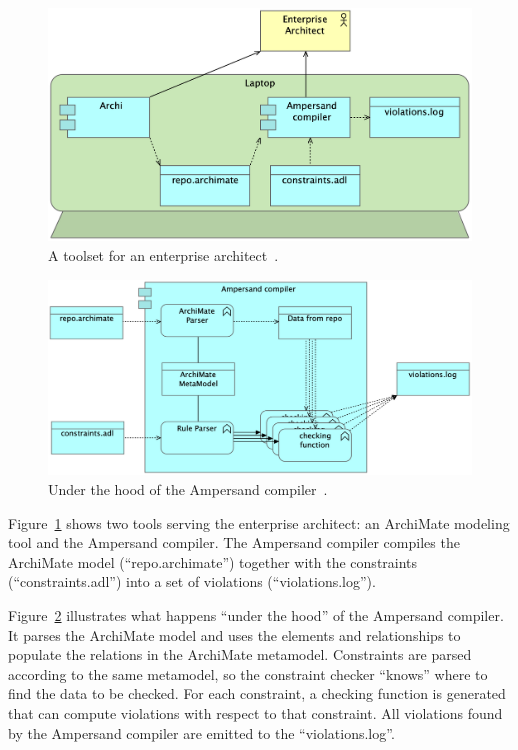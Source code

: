 \documentclass[sn-vancouver]{sn-jnl}%
\begin{document}
\begin{figure}[b]
 \centering
\includegraphics[clip=true, scale=0.19]{Figure4}
\caption{A toolset for an enterprise architect~\cite{iceis22}.}
\label{fig4}   %
\end{figure}
\begin{figure}[b]
 \centering
\includegraphics[clip=true, scale=0.16]{Figure5}
\caption{Under the hood of the Ampersand compiler~\cite{iceis22}.}
\label{fig5}
\end{figure}

Figure~\ref{fig4} shows two tools serving the enterprise architect: an ArchiMate modeling tool and the Ampersand compiler.
The Ampersand compiler compiles the ArchiMate model (``repo.archimate'') together with the constraints (``constraints.adl'') into a set of violations (``violations.log'').

Figure~\ref{fig5} illustrates what happens ``under the hood'' of the Ampersand compiler.
It parses the ArchiMate model and uses the elements and relationships to populate the relations in the ArchiMate metamodel.
Constraints are parsed according to the same metamodel, so the constraint checker ``knows'' where to find the data to be checked.
For each constraint, a checking function is generated that can compute violations with respect to that constraint.
All violations found by the Ampersand compiler are emitted to the ``violations.log''.
\end{document}
